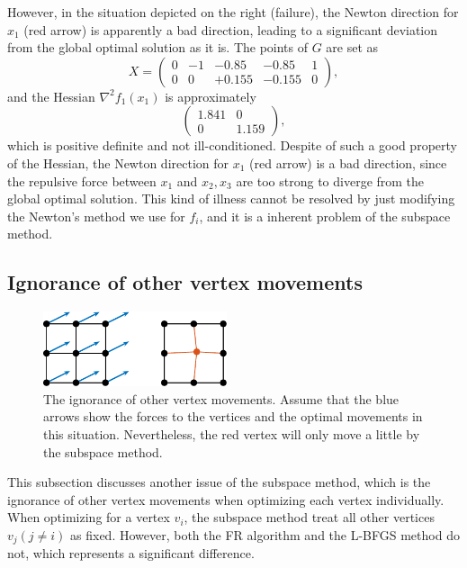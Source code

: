 \documentclass[dvipdfmx,journal]{IEEEtran}
\begin{document}
However, in the situation depicted on the right (failure), the Newton direction for $x_1$ (red arrow) is apparently a bad direction, leading to a significant deviation from the global optimal solution as it is.
The points of $G$ are set as
\begin{equation*}
  X = \begin{pmatrix}
    0 & -1 & -0.85  & -0.85  & 1 \\
    0 & 0  & +0.155 & -0.155 & 0
  \end{pmatrix},
\end{equation*}
and the Hessian $\nabla^2 f_1(x_1)$ is approximately
\begin{equation*}
  \begin{pmatrix}
    1.841 & 0     \\
    0     & 1.159
  \end{pmatrix},
\end{equation*}
which is positive definite and not ill-conditioned.
Despite of such a good property of the Hessian, the Newton direction for $x_1$ (red arrow) is a bad direction, since the repulsive force between $x_1$ and $x_2,x_3$ are too strong to diverge from the global optimal solution.
This kind of illness cannot be resolved by just modifying the Newton's method we use for $f_i$, and it is a inherent problem of the subspace method.

\subsection{Ignorance of other vertex movements}\label{ssec:ignorance}

\begin{figure}[t]
  \centering
  \includegraphics[height=2.2cm]{whyRSNfail2/whyRSNfail2.pdf}
  \caption{
    The ignorance of other vertex movements. Assume that the blue arrows show the forces to the vertices and the optimal movements in this situation. Nevertheless, the red vertex will only move a little by the subspace method.
  }
  \label{fig:whyRSNfail2}
\end{figure}

This subsection discusses another issue of the subspace method, which is the ignorance of other vertex movements when optimizing each vertex individually.
When optimizing for a vertex $v_i$, the subspace method treat all other vertices $v_j (j \neq i)$ as fixed. However, both the FR algorithm and the L-BFGS method do not, which represents a significant difference.
\end{document}
